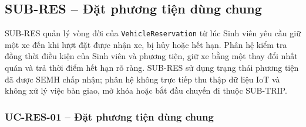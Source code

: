 \subsection{SUB-RES -- Đặt phương tiện dùng chung}

SUB-RES quản lý vòng đời của \texttt{VehicleReservation} từ lúc Sinh viên yêu cầu giữ một xe đến khi lượt đặt được nhận xe, bị hủy hoặc hết hạn. Phân hệ kiểm tra đồng thời điều kiện của Sinh viên và phương tiện, giữ xe bằng một thay đổi nhất quán và trả thời điểm hết hạn rõ ràng. SUB-RES sử dụng trạng thái phương tiện đã được SEMH chấp nhận; phân hệ không trực tiếp thu thập dữ liệu IoT và không xử lý việc bàn giao, mở khóa hoặc bắt đầu chuyến đi thuộc SUB-TRIP.

\subsubsection{UC-RES-01 -- Đặt phương tiện dùng chung}


